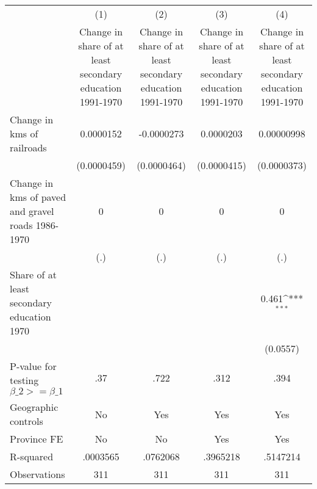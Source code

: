 {
\def\sym#1{\ifmmode^{#1}\else\(^{#1}\)\fi}
\begin{tabular}{l*{4}{c}}
\hline\hline
                &\multicolumn{1}{c}{(1)}&\multicolumn{1}{c}{(2)}&\multicolumn{1}{c}{(3)}&\multicolumn{1}{c}{(4)}\\
                &\multicolumn{1}{c}{Change in share of at least secondary education 1991-1970}&\multicolumn{1}{c}{Change in share of at least secondary education 1991-1970}&\multicolumn{1}{c}{Change in share of at least secondary education 1991-1970}&\multicolumn{1}{c}{Change in share of at least secondary education 1991-1970}\\
\hline
Change in kms of railroads&0.0000152         &-0.0000273         &0.0000203         &0.00000998         \\
                &(0.0000459)         &(0.0000464)         &(0.0000415)         &(0.0000373)         \\
[1em]
Change in kms of paved and gravel roads 1986-1970&        0         &        0         &        0         &        0         \\
                &      (.)         &      (.)         &      (.)         &      (.)         \\
[1em]
Share of at least secondary education 1970&                  &                  &                  &    0.461\sym{***}\\
                &                  &                  &                  & (0.0557)         \\
\hline
P-value for testing $\beta\_{2} >= \beta\_{1}$&      .37         &     .722         &     .312         &     .394         \\
Geographic controls&       No         &      Yes         &      Yes         &      Yes         \\
Province FE     &       No         &       No         &      Yes         &      Yes         \\
R-squared       & .0003565         & .0762068         & .3965218         & .5147214         \\
Observations    &      311         &      311         &      311         &      311         \\
\hline\hline
\end{tabular}
}
